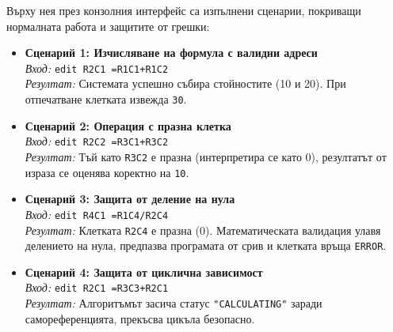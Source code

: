 Върху нея през конзолния интерфейс са изпълнени сценарии, покриващи нормалната работа и защитите от грешки:

\begin{itemize}
  \item \textbf{Сценарий 1: Изчисляване на формула с валидни адреси} \\
    \textit{Вход:} \texttt{edit R2C1 =R1C1+R1C2} \\
    \textit{Резултат:} Системата успешно събира стойностите (10 и 20). При отпечатване клетката извежда \texttt{30}.

  \item \textbf{Сценарий 2: Операция с празна клетка} \\
    \textit{Вход:} \texttt{edit R2C2 =R3C1+R3C2} \\
    \textit{Резултат:} Тъй като \texttt{R3C2} е празна (интерпретира се като 0), резултатът от израза се оценява коректно на \texttt{10}.

  \item \textbf{Сценарий 3: Защита от деление на нула} \\
    \textit{Вход:} \texttt{edit R4C1 =R1C4/R2C4} \\
    \textit{Резултат:} Клетката \texttt{R2C4} е празна (0). Математическата валидация улавя делението на нула, предпазва програмата от срив и клетката връща \texttt{ERROR}.

  \item \textbf{Сценарий 4: Защита от циклична зависимост} \\
    \textit{Вход:} \texttt{edit R2C1 =R3C3+R2C1} \\
    \textit{Резултат:} Алгоритъмът засича статус \texttt{"CALCULATING"} заради самореференцията, прекъсва цикъла безопасно.
\end{itemize}